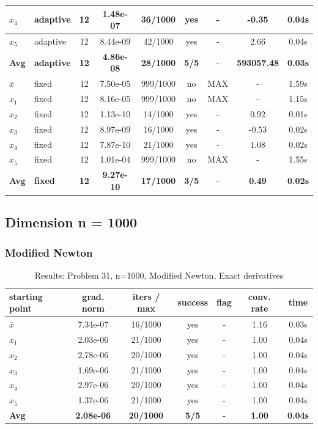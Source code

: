 \begin{longtable}{|l|l|c|c|c|c|c|c|c|}
\hline
$x_4$ & adaptive & 12 & 1.48e-07 & 36/1000 & yes & - & -0.35 & 0.04s \\
\hline
$x_5$ & adaptive & 12 & 8.44e-09 & 42/1000 & yes & - & 2.66 & 0.04s \\
\hline
\hline\hline
\textbf{Avg} & \textbf{adaptive} & \textbf{12} & \textbf{4.86e-08} & \textbf{28/1000} & \textbf{5/5} & - & \textbf{593057.48} & \textbf{0.03s} \\
\hline\hline
\hline
$\bar{x}$ & fixed & 12 & 7.50e-05 & 999/1000 & no & MAX & - & 1.59s \\
\hline
$x_1$ & fixed & 12 & 8.16e-05 & 999/1000 & no & MAX & - & 1.15s \\
\hline
$x_2$ & fixed & 12 & 1.13e-10 & 14/1000 & yes & - & 0.92 & 0.01s \\
\hline
$x_3$ & fixed & 12 & 8.97e-09 & 16/1000 & yes & - & -0.53 & 0.02s \\
\hline
$x_4$ & fixed & 12 & 7.87e-10 & 21/1000 & yes & - & 1.08 & 0.02s \\
\hline
$x_5$ & fixed & 12 & 1.01e-04 & 999/1000 & no & MAX & - & 1.55s \\
\hline
\hline\hline
\textbf{Avg} & \textbf{fixed} & \textbf{12} & \textbf{9.27e-10} & \textbf{17/1000} & \textbf{3/5} & - & \textbf{0.49} & \textbf{0.02s} \\
\hline\hline
\end{longtable}


\subsection{Dimension n = 1000}

\subsubsection{Modified Newton}

\begin{longtable}{|l|c|c|c|c|c|c|}
\caption{Results: Problem 31, n=1000, Modified Newton, Exact derivatives} \\
\hline
\textbf{starting point} & \textbf{grad. norm} & \textbf{iters / max} & \textbf{success} & \textbf{flag} & \textbf{conv. rate} & \textbf{time} \\
\hline
\endfirsthead
\endhead
\endfoot
\hline
\endlastfoot
$\bar{x}$ & 7.34e-07 & 16/1000 & yes & - & 1.16 & 0.03s \\
\hline
$x_1$ & 2.03e-06 & 21/1000 & yes & - & 1.00 & 0.04s \\
\hline
$x_2$ & 2.78e-06 & 20/1000 & yes & - & 1.00 & 0.04s \\
\hline
$x_3$ & 1.69e-06 & 21/1000 & yes & - & 1.00 & 0.04s \\
\hline
$x_4$ & 2.97e-06 & 20/1000 & yes & - & 1.00 & 0.04s \\
\hline
$x_5$ & 1.37e-06 & 21/1000 & yes & - & 1.00 & 0.04s \\
\hline
\hline\hline
\textbf{Avg} & \textbf{2.08e-06} & \textbf{20/1000} & \textbf{5/5} & - & \textbf{1.00} & \textbf{0.04s} \\
\hline\hline
\end{longtable}


